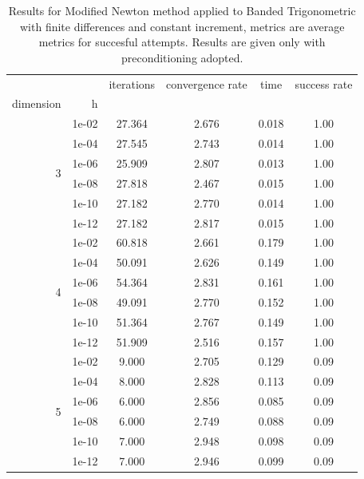 \begin{table}
\centering
\caption{Results for Modified Newton method applied to Banded Trigonometric with finite differences and constant increment, metrics are average metrics for succesful attempts. Results are given only with preconditioning adopted.}
\label{tab:Modified_Newton_Banded_Trigonometric_fd_abs}
\begin{tabular}{rr|cccc}
\toprule
    &  & iterations & convergence rate & time & success rate \\
dimension & h &  &  &  &  \\
\midrule
\multirow[t]{6}{*}{3} & 1e-02 & 27.364 & 2.676 & 0.018 & 1.00 \\
    & 1e-04 & 27.545 & 2.743 & 0.014 & 1.00 \\
    & 1e-06 & 25.909 & 2.807 & 0.013 & 1.00 \\
    & 1e-08 & 27.818 & 2.467 & 0.015 & 1.00 \\
    & 1e-10 & 27.182 & 2.770 & 0.014 & 1.00 \\
    & 1e-12 & 27.182 & 2.817 & 0.015 & 1.00 \\
\cline{1-6}
\multirow[t]{6}{*}{4} & 1e-02 & 60.818 & 2.661 & 0.179 & 1.00 \\
    & 1e-04 & 50.091 & 2.626 & 0.149 & 1.00 \\
    & 1e-06 & 54.364 & 2.831 & 0.161 & 1.00 \\
    & 1e-08 & 49.091 & 2.770 & 0.152 & 1.00 \\
    & 1e-10 & 51.364 & 2.767 & 0.149 & 1.00 \\
    & 1e-12 & 51.909 & 2.516 & 0.157 & 1.00 \\
\cline{1-6}
\multirow[t]{6}{*}{5} & 1e-02 & 9.000 & 2.705 & 0.129 & 0.09 \\
    & 1e-04 & 8.000 & 2.828 & 0.113 & 0.09 \\
    & 1e-06 & 6.000 & 2.856 & 0.085 & 0.09 \\
    & 1e-08 & 6.000 & 2.749 & 0.088 & 0.09 \\
    & 1e-10 & 7.000 & 2.948 & 0.098 & 0.09 \\
    & 1e-12 & 7.000 & 2.946 & 0.099 & 0.09 \\
\cline{1-6}
\bottomrule
\end{tabular}
\end{table}

